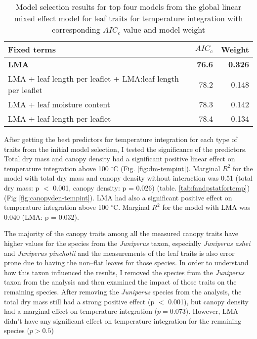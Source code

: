 \documentclass{ttuthes2007}
\begin{document}


\begin{table}
  \centering
  \caption{Model selection results for top four models from the global linear
    mixed effect model for leaf traits for temperature integration with
    corresponding $AIC_{c}$ value and model weight}
  \begin{tabular}{lrr}
    \toprule
    \textbf{Fixed terms} & $AIC_{c}$ & \textbf{Weight}\\
    \midrule
    \textbf{LMA} & \textbf{76.6} & \textbf{0.326} \\
    LMA + leaf length per leaflet + LMA:leaf length per leaflet & 78.2     & 0.148    \\
    LMA + leaf moisture content                                 & 78.3     & 0.142    \\
    LMA + leaf length per leaflet                               & 78.4     & 0.134    \\
    \bottomrule
  \end{tabular}
  \label{tab:leaf_models}
\end{table}




After getting the best predictors for temperature integration for each type of traits from the initial model selection,
I tested the significance of the predictors. Total dry mass and canopy density had a significant positive linear effect %
on temperature integration above 100 $^{\circ}$C (Fig. \ref{fig:dm-tempint}). Marginal $R^2$ for the model with total dry mass and canopy density without interaction was 0.51 (total dry mass: p $<$ 0.001, canopy density: p = 0.026) (table. \ref{tab:fandpstatfortemp}) (Fig \ref{fig:canopyden-tempint}). LMA had also a significant positive effect on temperature integration above 100 $^{\circ}$C. Marginal $R^2$ for the model with LMA was 0.040 (LMA: p = 0.032). 

The majority of the canopy traits among all the measured canopy traits have higher values for the species from the \emph{Juniperus} taxon, especially \emph{Juniperus ashei} and \emph{Juniperus pinchotii} and the measurements of the leaf traits is also error prone due to having the non--flat leaves for those species. In order to understand how this taxon influenced the results, I removed the species from the \emph{Juniperus} taxon from the analysis and then examined the impact of those traits on the remaining species. After removing the \emph{Juniperus} species from the analysis, the total dry mass still had a strong positive effect (p $<$ 0.001), but canopy density had a marginal effect on temperature integration ($p = 0.073$). However, LMA didn't have any significant effect on temperature integration for the remaining species ($p > 0.5$) 
\end{document}
